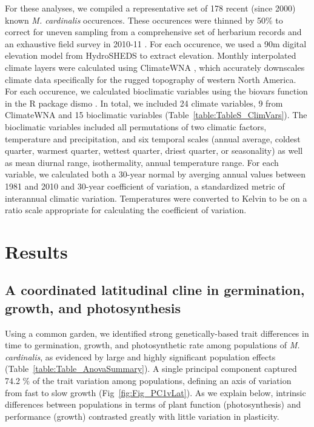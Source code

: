 \documentclass[11pt, oneside]{article}
\newcommand{\pkg}[1]{{\fontseries{b}\selectfont #1}}
\begin{document}
For these analyses, we compiled a representative set of 178 recent (since 2000) known \textit{M. cardinalis} occurences. These occurences were thinned by 50\% to correct for uneven sampling from a comprehensive set of herbarium records and an exhaustive field survey in 2010-11 \citep{Angert_ENM}. For each occurence, we used a 90m digital elevation model from HydroSHEDS \citep{Lehner_etal_2006} to extract elevation. Monthly interpolated climate layers were calculated using ClimateWNA \citep{Wang_etal_2012}, which accurately downscales climate data specifically for the rugged topography of western North America. For each occurence, we calculated bioclimatic variables using the biovars function in the R package \pkg{dismo} \citep{Hijmans_etal_2014}. In total, we included 24 climate variables, 9 from ClimateWNA and 15 bioclimatic variables (Table~\ref{table:TableS_ClimVars}). The bioclimatic variables included all permutations of two climatic factors, temperature and precipitation, and six temporal scales (annual average, coldest quarter, warmest quarter, wettest quarter, driest quarter, or seasonality) as well as mean diurnal range, isothermality, annual temperature range. For each variable, we calculated both a 30-year normal by averging annual values between 1981 and 2010 and 30-year coefficient of variation, a standardized metric of interannual climatic variation. Temperatures were converted to Kelvin to be on a ratio scale appropriate for calculating the coefficient of variation. 


\section*{Results}

\subsection*{A coordinated latitudinal cline in germination, growth, and photosynthesis}

Using a common garden, we identified strong genetically-based trait differences in time to germination, growth, and photosynthetic rate among populations of \textit{M. cardinalis}, as evidenced by large and highly significant population effects (Table~\ref{table:Table_AnovaSummary}). A single principal component captured 74.2 \% of the trait variation among populations, defining an axis of variation from fast to slow growth (Fig~\ref{fig:Fig_PC1vLat}). As we explain below, intrinsic differences between populations in terms of plant function (photosynthesis) and performance (growth) contrasted greatly with little variation in plasticity.
\end{document}
